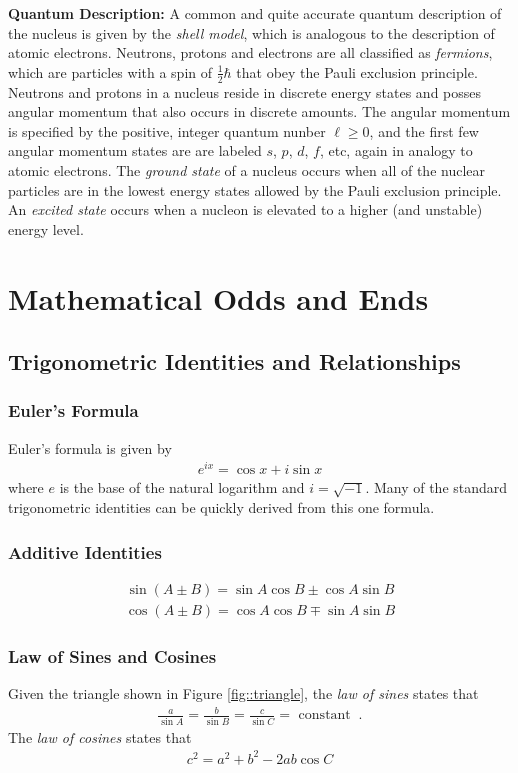 \documentclass[11pt]{article}
\begin{document}
\textbf{Quantum Description:}  A common and quite accurate quantum description of the nucleus is given by the \emph{shell model}, which is analogous to the description of atomic electrons.  Neutrons, protons and electrons are all classified as \emph{fermions}, which are particles with a spin of \(\frac{1}{2}\hbar\) that obey the Pauli exclusion principle.  Neutrons and protons in a nucleus reside in discrete energy states and posses angular momentum that also occurs in discrete amounts.  The angular momentum is specified by the positive, integer quantum nunber \(\ell \geq 0\), and the first few angular momentum states are are labeled \(s\), \(p\), \(d\), \(f\), etc, again in analogy to atomic electrons.  The \emph{ground state} of a nucleus occurs when all of the nuclear particles are in the lowest energy states allowed by the Pauli exclusion principle.  An \emph{excited state} occurs when a nucleon is elevated to a higher (and unstable) energy level.

\section{Mathematical Odds and Ends}
\label{sec:orgheadline56}
\subsection{Trigonometric Identities and Relationships}
\label{sec:orgheadline48}
\subsubsection{Euler's Formula}
\label{sec:orgheadline45}
Euler's formula is given by
\begin{align}
  e^{i x} = \cos x + i \sin x
\end{align}
where \(e\) is the base of the natural logarithm and \(i = \sqrt{-1}\).  Many of the standard trigonometric identities can be quickly derived from this one formula.
\subsubsection{Additive Identities}
\label{sec:orgheadline46}
\begin{align}
  \sin\left(A \pm B\right) = \sin A \cos B \pm \cos A \sin B
\end{align}
\begin{align}
  \cos\left(A \pm B\right) = \cos A \cos B \mp \sin A \sin B
\end{align}
\subsubsection{Law of Sines and Cosines}
\label{sec:orgheadline47}
Given the triangle shown in Figure \ref{fig::triangle}, the \emph{law of sines} states that
\begin{align}
  \frac{a}{\sin A} = \frac{b}{\sin B} = \frac{c}{\sin C} = \text{ constant} \;\;.
\end{align}
The \emph{law of cosines} states that
\begin{align}
  c^2 = a^2 + b^2 - 2ab\cos{C}
\end{align}
\end{document}
